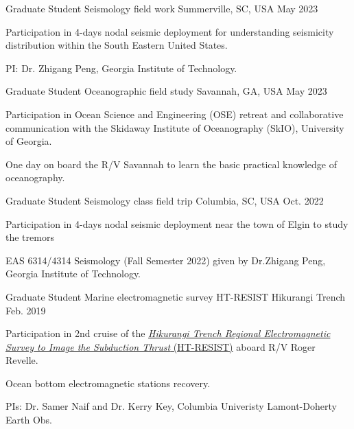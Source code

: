 \begin{cventries}
  \cventry
    {Graduate Student} %
    {Seismology field work} %
    {Summerville, SC, USA} %
    {May 2023} %
    {
      \begin{cvitems} %
        \item {Participation in 4-days nodal seismic deployment for understanding seismicity distribution within the South Eastern United States.}
        \item PI: Dr. Zhigang Peng, Georgia Institute of Technology.
      \end{cvitems}
    }

  \cventry
    {Graduate Student} %
    {Oceanographic field study} %
    {Savannah, GA, USA} %
    {May 2023} %
    {
      \begin{cvitems} %
        \item {Participation in Ocean Science and Engineering (OSE) retreat and collaborative communication with the Skidaway Institute of Oceanography (SkIO), University of Georgia.}
        \item {One day on board the R/V Savannah to learn the basic practical knowledge of oceanography.} 
      \end{cvitems}
    }

  \cventry
    {Graduate Student} %
    {Seismology class field trip} %
    {Columbia, SC, USA} %
    {Oct. 2022} %
    {
      \begin{cvitems} %
        \item {Participation in 4-days nodal seismic deployment near the town of Elgin to study the tremors
        \item EAS 6314/4314 Seismology (Fall Semester 2022) given by Dr.Zhigang Peng, Georgia Institute of Technology.}
      \end{cvitems}
    }

  \cventry
    {Graduate Student} %
    {Marine electromagnetic survey HT-RESIST} %
    {Hikurangi Trench} %
    {Feb. 2019} %
    {
      \begin{cvitems} %
        \item {Participation in 2nd cruise of the \href{https://egl.eas.gatech.edu/projects/resist/}{\textit{Hikurangi Trench Regional Electromagnetic Survey to Image the Subduction Thrust} (HT-RESIST)} aboard R/V Roger Revelle.}
        \item {Ocean bottom electromagnetic stations recovery.}
        \item PIs: Dr. Samer Naif and Dr. Kerry Key, Columbia Univeristy Lamont-Doherty Earth Obs.
      \end{cvitems}
    }


\end{cventries}
